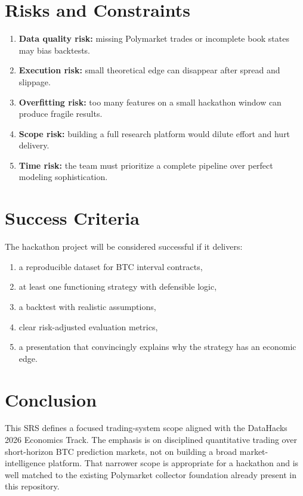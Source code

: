 \documentclass[11pt, letterpaper]{article}
\begin{document}
\section{Risks and Constraints}

\begin{enumerate}[nosep]
    \item \textbf{Data quality risk:} missing Polymarket trades or incomplete book states may bias backtests.
    \item \textbf{Execution risk:} small theoretical edge can disappear after spread and slippage.
    \item \textbf{Overfitting risk:} too many features on a small hackathon window can produce fragile results.
    \item \textbf{Scope risk:} building a full research platform would dilute effort and hurt delivery.
    \item \textbf{Time risk:} the team must prioritize a complete pipeline over perfect modeling sophistication.
\end{enumerate}

\section{Success Criteria}

The hackathon project will be considered successful if it delivers:

\begin{enumerate}[nosep]
    \item a reproducible dataset for BTC interval contracts,
    \item at least one functioning strategy with defensible logic,
    \item a backtest with realistic assumptions,
    \item clear risk-adjusted evaluation metrics,
    \item a presentation that convincingly explains why the strategy has an economic edge.
\end{enumerate}

\section{Conclusion}

This SRS defines a focused trading-system scope aligned with the DataHacks 2026 Economics Track. The emphasis is on disciplined quantitative trading over short-horizon BTC prediction markets, not on building a broad market-intelligence platform. That narrower scope is appropriate for a hackathon and is well matched to the existing Polymarket collector foundation already present in this repository.
\end{document}

